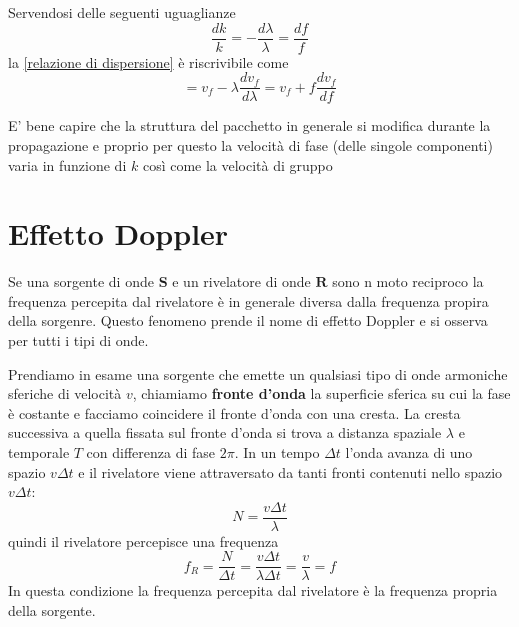 \documentclass[x11names]{report}
\begin{document}
	\begin{es}{}
		Servendosi delle seguenti uguaglianze
		\[ 
		\boxed{\frac{dk}{k}} = \boxed{-\frac{d\lambda}{\lambda}} = \boxed{\frac{df}{f}}
		\]
		la \ref{relazione di dispersione} è riscrivibile come 
		\[ 
		= v_f - \lambda \frac{dv_f}{d\lambda} = v_f + f\frac{dv_f}{df}
		\]
	\end{es}
	
	E' bene capire che la struttura del pacchetto in generale si modifica durante la propagazione e proprio per questo la velocità di fase (delle singole componenti) varia in funzione di \(k\) così come la velocità di gruppo
	\newpage
	\section{Effetto Doppler}
	Se una sorgente di onde \(\boldsymbol{S}\) e un rivelatore di onde \(\boldsymbol{R}\) sono n moto reciproco la frequenza percepita dal rivelatore è in generale diversa dalla frequenza propira della sorgenre. Questo fenomeno prende il nome di effetto Doppler e si osserva per tutti i tipi di onde.
	
	Prendiamo in esame una sorgente che emette un qualsiasi tipo di onde armoniche sferiche di velocità \(v\), chiamiamo \textbf{fronte d'onda} la superficie sferica su cui la fase è costante e facciamo coincidere il fronte d'onda con una cresta. La cresta successiva a quella fissata sul fronte d'onda si trova a distanza spaziale \(\lambda\) e temporale \(T\) con differenza di fase \(2\pi \). In un tempo \(\Delta t\) l'onda avanza di uno spazio \(v\Delta t\) e il rivelatore viene attraversato da tanti fronti contenuti nello spazio \(v\Delta t\): 
	\[ 
	N = \frac{v\Delta t}{\lambda}
	\]
	quindi il rivelatore percepisce una frequenza
	\[
	f_R = \frac{N}{\Delta t}= \frac{v\Delta t}{\lambda \Delta t} = \frac{v}{\lambda} = f
	\]
	In questa condizione la frequenza percepita dal rivelatore è la frequenza propria della sorgente.
	
\end{document}
